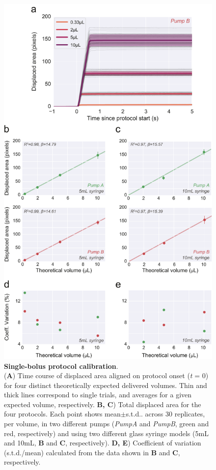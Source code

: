 \begin{figure}
	\centering
	\includegraphics[width=1.0\linewidth]{Figures/Artboard 5.pdf}
	\caption{\textbf{Single-bolus protocol calibration}.\\
		(\textbf{A}) Time course of displaced area aligned on protocol onset (\textit{t} = 0) for four distinct theoretically expected delivered volumes. Thin and thick lines correspond to single trials, and averages for a given expected volume, respectively. \textbf{B, C}) Total displaced area for the four protocols. Each point shows mean$\pm$s.t.d.. across 30 replicates, per volume, in two different pumps (\textit{PumpA} and \textit{PumpB}, green and red, respectively) and using two different glass syringe models (5mL and 10mL, \textbf{B} and \textbf{C}, respectively). \textbf{D, E}) Coefficient of variation (s.t.d./mean) calculated from the data shown in \textbf{B} and \textbf{C}, respectively.}
	\label{fig:SingleStepCalibration} 
\end{figure}

